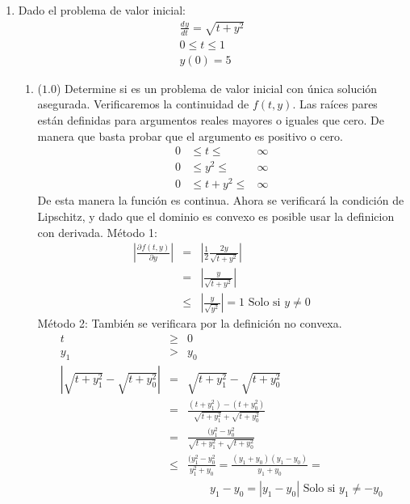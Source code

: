 \documentclass[12pt]{article}
\newcommand{\diff}[3]{\frac{d^{#3} #1}{d#2^{#3}}}
\newcommand{\pdiff}[3]{\frac{\partial^{#3} #1}{\partial#2^{#3}}}
\newcommand{\abs}[1]{\left| #1 \right|}
\begin{document}
  \begin{enumerate}[leftmargin=*,widest=9]
    \item Dado el problema de valor inicial:
    \begin{eqnarray*}
    \diff{y}{t}{} = \sqrt{t+y^2} \\
    0 \leq t \leq 1\\
    y(0) = 5
\end{eqnarray*}
    \begin{enumerate}[label=\alph*]
    \item (\(1.0\)) Determine si es un problema de valor inicial con única solución asegurada.
   Verificaremos la continuidad de \(f(t,y)\). Las raíces pares están definidas para argumentos reales mayores o iguales que cero. De manera que basta probar que el argumento es positivo o cero.
   \begin{equation}
   \begin{matrix}
   0 & \leq t \leq & \infty\\
   0 & \leq y^2 \leq & \infty\\
   \hline
   0 & \leq t + y^2 \leq & \infty
   \end{matrix}
   \end{equation}
   De esta manera la función es continua. Ahora se verificará la condición de Lipschitz, y dado que el dominio es convexo es posible usar la definicion con derivada.
   Método 1:
   \begin{eqnarray*}
   \abs{\pdiff{f(t, y)}{y}{}} & = & \abs{\frac{1}{2}\frac{2y}{\sqrt{t+y^2}}} \\
   & = & \abs{\frac{y}{\sqrt{t+y^2}}} \\
   & \leq & \abs{\frac{y}{\sqrt{y^2}}} = 1 \text{  Solo si $y \neq 0$}
   \end{eqnarray*}
   Método 2:
   También se verificara por la definición no convexa.
   \begin{eqnarray*}
   t & \geq & 0\\
   y_1 & > & y_0\\
   \abs{\sqrt{t+y_1^2} - \sqrt{t+y_0^2}} &=& \sqrt{t+y_1^2} - \sqrt{t+y_0^2}\\
   & = & \frac{(t+y_1^2)-(t+y_0^2)}{\sqrt{t+y_1^2}+\sqrt{t+y_0^2}}\\
   & = & \frac{(y_1^2-y_0^2}{\sqrt{t+y_1^2}+\sqrt{t+y_0^2}}\\
   & \leq & \frac{(y_1^2-y_0^2}{y_1^2+y_0} = \frac{(y_1+y_0)(y_1-y_0)}{y_1+y_0} = \\
   & & \qquad y_1 - y_0 = \abs{y_1 - y_0} \text{  Solo si \(y_1 \neq -y_0\)}

\end{eqnarray*}
\end{enumerate}
\end{enumerate}
\end{document}
